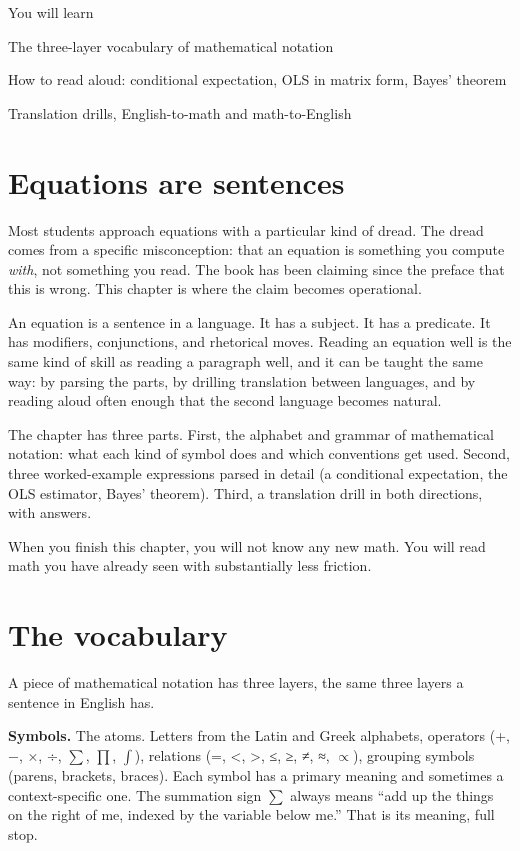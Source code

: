 \documentclass[
  letterpaper,
  11pt,
  twoside,
  openany]{scrbook}
\begin{document}
{You will learn}

The three-layer vocabulary of mathematical notation

How to read aloud: conditional expectation, OLS in matrix form, Bayes'
theorem

Translation drills, English-to-math and math-to-English

\section{Equations are sentences}\label{equations-are-sentences}

Most students approach equations with a particular kind of dread. The
dread comes from a specific misconception: that an equation is something
you compute \emph{with}, not something you read. The book has been
claiming since the preface that this is wrong. This chapter is where the
claim becomes operational.

An equation is a sentence in a language. It has a subject. It has a
predicate. It has modifiers, conjunctions, and rhetorical moves. Reading
an equation well is the same kind of skill as reading a paragraph well,
and it can be taught the same way: by parsing the parts, by drilling
translation between languages, and by reading aloud often enough that
the second language becomes natural.

The chapter has three parts. First, the alphabet and grammar of
mathematical notation: what each kind of symbol does and which
conventions get used. Second, three worked-example expressions parsed in
detail (a conditional expectation, the OLS estimator, Bayes' theorem).
Third, a translation drill in both directions, with answers.

When you finish this chapter, you will not know any new math. You will
read math you have already seen with substantially less friction.

\section{The vocabulary}\label{the-vocabulary}

A piece of mathematical notation has three layers, the same three layers
a sentence in English has.

\textbf{Symbols.} The atoms. Letters from the Latin and Greek alphabets,
operators (+, −, ×, ÷, \(\sum\), \(\prod\), \(\int\)), relations (=,
\textless, \textgreater, ≤, ≥, ≠, ≈, \(\propto\)), grouping symbols
(parens, brackets, braces). Each symbol has a primary meaning and
sometimes a context-specific one. The summation sign \(\sum\) always
means ``add up the things on the right of me, indexed by the variable
below me.'' That is its meaning, full stop.
\end{document}
